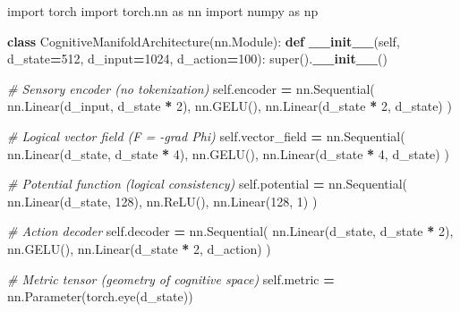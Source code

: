 \documentclass[
  11pt,
  a4paper,
]{article}
\newenvironment{Shaded}{\begin{snugshade}}{\end{snugshade}}
\newcommand{\BuiltInTok}[1]{#1}
\newcommand{\CommentTok}[1]{\textcolor[rgb]{0.56,0.35,0.01}{\textit{#1}}}
\newcommand{\DecValTok}[1]{\textcolor[rgb]{0.00,0.00,0.81}{#1}}
\newcommand{\FunctionTok}[1]{\textcolor[rgb]{0.13,0.29,0.53}{\textbf{#1}}}
\newcommand{\ImportTok}[1]{#1}
\newcommand{\KeywordTok}[1]{\textcolor[rgb]{0.13,0.29,0.53}{\textbf{#1}}}
\newcommand{\NormalTok}[1]{#1}
\newcommand{\OperatorTok}[1]{\textcolor[rgb]{0.81,0.36,0.00}{\textbf{#1}}}
\newcommand{\VariableTok}[1]{\textcolor[rgb]{0.00,0.00,0.00}{#1}}
\begin{document}
\begin{Shaded}
\begin{Highlighting}[]
\ImportTok{import}\NormalTok{ torch}
\ImportTok{import}\NormalTok{ torch.nn }\ImportTok{as}\NormalTok{ nn}
\ImportTok{import}\NormalTok{ numpy }\ImportTok{as}\NormalTok{ np}

\KeywordTok{class}\NormalTok{ CognitiveManifoldArchitecture(nn.Module):}
    \KeywordTok{def} \FunctionTok{\_\_init\_\_}\NormalTok{(}\VariableTok{self}\NormalTok{, d\_state}\OperatorTok{=}\DecValTok{512}\NormalTok{, d\_input}\OperatorTok{=}\DecValTok{1024}\NormalTok{, d\_action}\OperatorTok{=}\DecValTok{100}\NormalTok{):}
        \BuiltInTok{super}\NormalTok{().}\FunctionTok{\_\_init\_\_}\NormalTok{()}
        
        \CommentTok{\# Sensory encoder (no tokenization)}
        \VariableTok{self}\NormalTok{.encoder }\OperatorTok{=}\NormalTok{ nn.Sequential(}
\NormalTok{            nn.Linear(d\_input, d\_state }\OperatorTok{*} \DecValTok{2}\NormalTok{),}
\NormalTok{            nn.GELU(),}
\NormalTok{            nn.Linear(d\_state }\OperatorTok{*} \DecValTok{2}\NormalTok{, d\_state)}
\NormalTok{        )}
        
        \CommentTok{\# Logical vector field (F = {-}grad Phi)}
        \VariableTok{self}\NormalTok{.vector\_field }\OperatorTok{=}\NormalTok{ nn.Sequential(}
\NormalTok{            nn.Linear(d\_state, d\_state }\OperatorTok{*} \DecValTok{4}\NormalTok{),}
\NormalTok{            nn.GELU(),}
\NormalTok{            nn.Linear(d\_state }\OperatorTok{*} \DecValTok{4}\NormalTok{, d\_state)}
\NormalTok{        )}
        
        \CommentTok{\# Potential function (logical consistency)}
        \VariableTok{self}\NormalTok{.potential }\OperatorTok{=}\NormalTok{ nn.Sequential(}
\NormalTok{            nn.Linear(d\_state, }\DecValTok{128}\NormalTok{),}
\NormalTok{            nn.ReLU(),}
\NormalTok{            nn.Linear(}\DecValTok{128}\NormalTok{, }\DecValTok{1}\NormalTok{)}
\NormalTok{        )}
        
        \CommentTok{\# Action decoder}
        \VariableTok{self}\NormalTok{.decoder }\OperatorTok{=}\NormalTok{ nn.Sequential(}
\NormalTok{            nn.Linear(d\_state, d\_state }\OperatorTok{*} \DecValTok{2}\NormalTok{),}
\NormalTok{            nn.GELU(),}
\NormalTok{            nn.Linear(d\_state }\OperatorTok{*} \DecValTok{2}\NormalTok{, d\_action)}
\NormalTok{        )}
        
        \CommentTok{\# Metric tensor (geometry of cognitive space)}
        \VariableTok{self}\NormalTok{.metric }\OperatorTok{=}\NormalTok{ nn.Parameter(torch.eye(d\_state))}
        

\end{Highlighting}
\end{Shaded}
\end{document}
